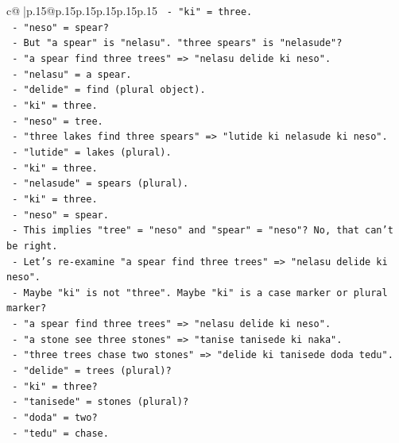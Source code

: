 \documentclass{article}
\begin{document}
{\begin{supertabular}{c@{$\;$}|p{.15\linewidth}@{}p{.15\linewidth}p{.15\linewidth}p{.15\linewidth}p{.15\linewidth}p{.15\linewidth}}
{{{\texttt{               {-} "ki" = three.} \\
\texttt{               {-} "neso" = spear?} \\
\texttt{             {-} But "a spear" is "nelasu". "three spears" is "nelasude"?} \\
\texttt{             {-} "a spear find three trees" => "nelasu delide ki neso".} \\
\texttt{               {-} "nelasu" = a spear.} \\
\texttt{               {-} "delide" = find (plural object).} \\
\texttt{               {-} "ki" = three.} \\
\texttt{               {-} "neso" = tree.} \\
\texttt{             {-} "three lakes find three spears" => "lutide ki nelasude ki neso".} \\
\texttt{               {-} "lutide" = lakes (plural).} \\
\texttt{               {-} "ki" = three.} \\
\texttt{               {-} "nelasude" = spears (plural).} \\
\texttt{               {-} "ki" = three.} \\
\texttt{               {-} "neso" = spear.} \\
\texttt{             {-} This implies "tree" = "neso" and "spear" = "neso"? No, that can't be right.} \\
\texttt{             {-} Let's re{-}examine "a spear find three trees" => "nelasu delide ki neso".} \\
\texttt{             {-} Maybe "ki" is not "three". Maybe "ki" is a case marker or plural marker?} \\
\texttt{             {-} "a spear find three trees" => "nelasu delide ki neso".} \\
\texttt{             {-} "a stone see three stones" => "tanise tanisede ki naka".} \\
\texttt{             {-} "three trees chase two stones" => "delide ki tanisede doda tedu".} \\
\texttt{               {-} "delide" = trees (plural)?} \\
\texttt{               {-} "ki" = three?} \\
\texttt{               {-} "tanisede" = stones (plural)?} \\
\texttt{               {-} "doda" = two?} \\
\texttt{               {-} "tedu" = chase.} \\
}}}
\end{supertabular}}
\end{document}
